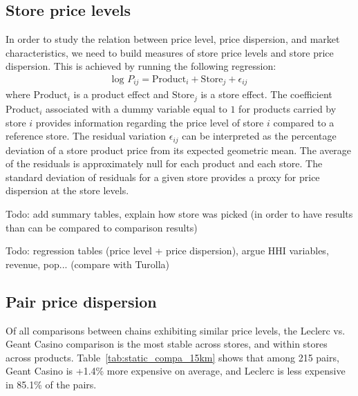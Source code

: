 \documentclass[english]{article}
\begin{document}
\subsection{Store price levels}

In order to study the relation between price level, price dispersion, and market characteristics, we need to build measures of store price levels and store price dispersion. This is achieved by running the following regression:
\begin{align*}
\text{log }P_{ij} = \text{Product}_i + \text{Store}_j + \epsilon_{ij}
\end{align*}
where $\text{Product}_i$ is a product effect and $\text{Store}_j$ is a store effect. The coefficient $\text{Product}_i$ associated with a dummy variable equal to $1$ for products carried by store $i$ provides information regarding the price level of store $i$ compared to a reference store. The residual variation $\epsilon_{ij}$ can be interpreted as the percentage deviation of a store product price from its expected geometric mean. The average of the residuals is approximately null for each product and each store. The standard deviation of residuals for a given store provides a proxy for price dispersion at the store levels.

Todo: add summary tables, explain how store was picked (in order to have results than can be compared to comparison results)

Todo: regression tables (price level + price dispersion), argue HHI variables, revenue, pop... (compare with Turolla)

\subsection{Pair price dispersion}

Of all comparisons between chains exhibiting similar price levels, the Leclerc vs. Geant Casino comparison is the most stable across stores, and within stores across products. Table~\ref{tab:static_compa_15km} shows that among 215 pairs, Geant Casino is +1.4\% more expensive on average, and Leclerc is less expensive in 85.1\% of the pairs.
\end{document}

